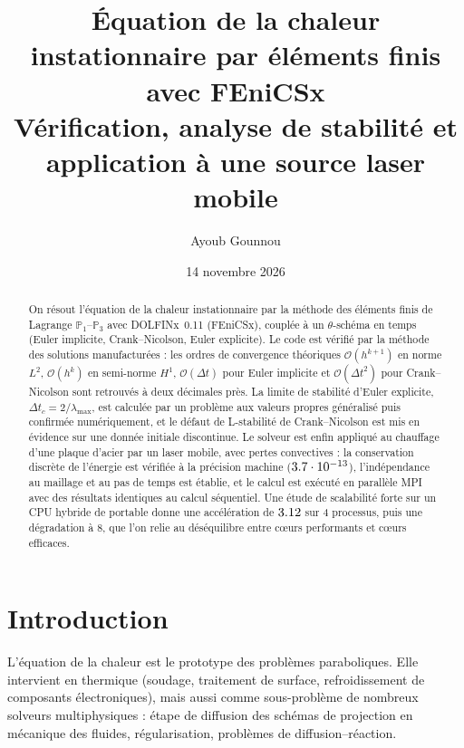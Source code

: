 \documentclass[11pt,a4paper]{article}
\title{\textbf{Équation de la chaleur instationnaire par éléments finis avec FEniCSx}\\[0.4em]
\large Vérification, analyse de stabilité et application à une source laser mobile}
\author{Ayoub Gounnou}
\date{14 novembre 2026}
\begin{document}
\maketitle

\begin{abstract}
On résout l'équation de la chaleur instationnaire par la méthode des éléments finis de Lagrange
$\mathbb{P}_1$--$\mathbb{P}_3$ avec DOLFINx~0.11 (FEniCSx), couplée à un $\theta$-schéma en temps
(Euler implicite, Crank--Nicolson, Euler explicite). Le code est vérifié par la méthode des solutions
manufacturées : les ordres de convergence théoriques $\mathcal{O}(h^{k+1})$ en norme $L^2$,
$\mathcal{O}(h^{k})$ en semi-norme $H^1$, $\mathcal{O}(\Delta t)$ pour Euler implicite et
$\mathcal{O}(\Delta t^2)$ pour Crank--Nicolson sont retrouvés à deux décimales près. La limite de
stabilité d'Euler explicite, $\Delta t_c = 2/\lambda_{\max}$, est calculée par un problème aux valeurs
propres généralisé puis confirmée numériquement, et le défaut de L-stabilité de Crank--Nicolson est mis
en évidence sur une donnée initiale discontinue. Le solveur est enfin appliqué au chauffage d'une plaque
d'acier par un laser mobile, avec pertes convectives : la conservation discrète de l'énergie est vérifiée
à la précision machine ($\num{3.7}\cdot 10^{-13}$), l'indépendance au maillage et au pas de temps est établie, et le
calcul est exécuté en parallèle MPI avec des résultats identiques au calcul séquentiel. Une étude de
scalabilité forte sur un CPU hybride de portable donne une accélération de $\num{3.12}$ sur 4 processus,
puis une dégradation à 8, que l'on relie au déséquilibre entre cœurs performants et cœurs efficaces.
\end{abstract}

\tableofcontents
\newpage

\section{Introduction}
L'équation de la chaleur est le prototype des problèmes paraboliques. Elle intervient en thermique
(soudage, traitement de surface, refroidissement de composants électroniques), mais aussi comme
sous-problème de nombreux solveurs multiphysiques : étape de diffusion des schémas de projection en
mécanique des fluides, régularisation, problèmes de diffusion--réaction.
\end{document}
